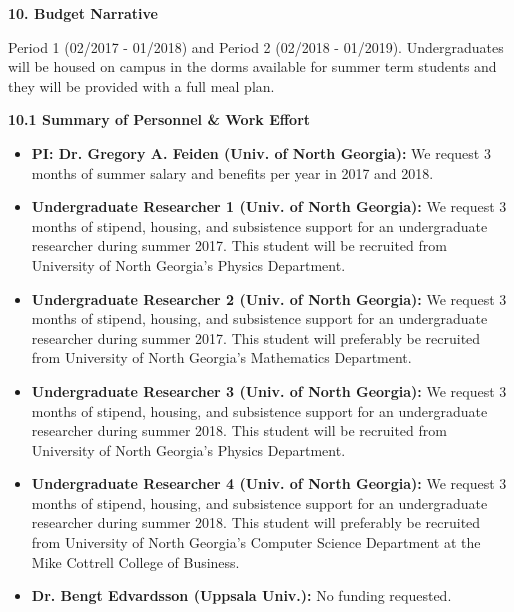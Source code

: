 %

{\bf\large 10. Budget Narrative} 

Period 1 (02/2017 - 01/2018) and Period 2 (02/2018 - 01/2019). Undergraduates will be housed on campus in the dorms available for summer term students and they will be provided with a full meal plan.

{\bf 10.1 Summary of Personnel \& Work Effort}

\begin{itemize}
	\item[] {\bf PI: Dr. Gregory A. Feiden (Univ. of North Georgia):} We request 3 months of summer salary and benefits per year in 2017 and 2018.  \\
	
	\item[] {\bf Undergraduate Researcher 1 (Univ. of North Georgia):} We request 3 months of stipend, housing, and subsistence support for an undergraduate researcher during summer 2017. This student will be recruited from University of North Georgia's Physics Department.  \\
	
	\item[] {\bf Undergraduate Researcher 2 (Univ. of North Georgia):} We request 3 months of stipend, housing, and subsistence support for an undergraduate researcher during summer 2017. This student will preferably be recruited from University of North Georgia's Mathematics Department. \\
	
	\item[] {\bf Undergraduate Researcher 3 (Univ. of North Georgia):} We request 3 months of stipend, housing, and subsistence support for an undergraduate researcher during summer 2018. This student will be recruited from University of North Georgia's Physics Department. \\
	
	\item[] {\bf Undergraduate Researcher 4 (Univ. of North Georgia):} We request 3 months of stipend, housing, and subsistence support for an undergraduate researcher during summer 2018. This student will preferably be recruited from University of North Georgia's Computer Science Department at the Mike Cottrell College of Business. \\
		
	\item[] {\bf Dr. Bengt Edvardsson (Uppsala Univ.):} No funding requested. \\
	

\end{itemize}

